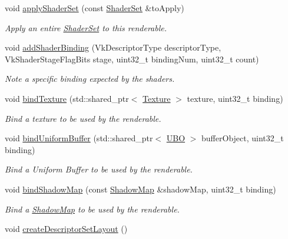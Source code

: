 \begin{DoxyCompactItemize}
void \mbox{\hyperlink{class_renderable_aecd652d7761d322b4d485ea2eb047ade}{apply\+Shader\+Set}} (const \mbox{\hyperlink{struct_shader_set}{Shader\+Set}} \&to\+Apply)
\begin{DoxyCompactList}\small\item\em Apply an entire \mbox{\hyperlink{struct_shader_set}{Shader\+Set}} to this renderable. \end{DoxyCompactList}\item 
void \mbox{\hyperlink{class_renderable_a9b19d309beed3946a3e7f3391d0ad711}{add\+Shader\+Binding}} (Vk\+Descriptor\+Type descriptor\+Type, Vk\+Shader\+Stage\+Flag\+Bits stage, uint32\+\_\+t binding\+Num, uint32\+\_\+t count)
\begin{DoxyCompactList}\small\item\em Note a specific binding expected by the shaders. \end{DoxyCompactList}\item 
void \mbox{\hyperlink{class_renderable_ae0addbfb8f0af5438106b86da42adca2}{bind\+Texture}} (std\+::shared\+\_\+ptr$<$ \mbox{\hyperlink{class_texture}{Texture}} $>$ texture, uint32\+\_\+t binding)
\begin{DoxyCompactList}\small\item\em Bind a texture to be used by the renderable. \end{DoxyCompactList}\item 
void \mbox{\hyperlink{class_renderable_aac8e561417791f38f6dc5899d580a09a}{bind\+Uniform\+Buffer}} (std\+::shared\+\_\+ptr$<$ \mbox{\hyperlink{struct_u_b_o}{U\+BO}} $>$ buffer\+Object, uint32\+\_\+t binding)
\begin{DoxyCompactList}\small\item\em Bind a Uniform Buffer to be used by the renderable. \end{DoxyCompactList}\item 
void \mbox{\hyperlink{class_renderable_a16cfd403246dc15dca9b029bab7f2705}{bind\+Shadow\+Map}} (const \mbox{\hyperlink{struct_shadow_map}{Shadow\+Map}} \&shadow\+Map, uint32\+\_\+t binding)
\begin{DoxyCompactList}\small\item\em Bind a \mbox{\hyperlink{struct_shadow_map}{Shadow\+Map}} to be used by the renderable. \end{DoxyCompactList}\item 
\mbox{\label{class_renderable_aa8e4e151ce4c2fcae97d50b2df1cfbd9}} 
void \mbox{\hyperlink{class_renderable_aa8e4e151ce4c2fcae97d50b2df1cfbd9}{create\+Descriptor\+Set\+Layout}} ()

\end{DoxyCompactItemize}
